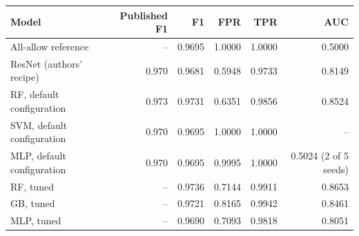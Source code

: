 \begin{tabular}{lrrrrr}
\toprule
Model & Published F1 & F1 & FPR & TPR & AUC \\
\midrule
All-allow reference & -- & 0.9695 & 1.0000 & 1.0000 & 0.5000 \\
\midrule
ResNet (authors' recipe) & 0.970 & 0.9681 & 0.5948 & 0.9733 & 0.8149 \\
RF, default configuration & 0.973 & 0.9731 & 0.6351 & 0.9856 & 0.8524 \\
SVM, default configuration & 0.970 & 0.9695 & 1.0000 & 1.0000 & -- \\
MLP, default configuration & 0.970 & 0.9695 & 0.9995 & 1.0000 & 0.5024 (2 of 5 seeds) \\
RF, tuned & -- & 0.9736 & 0.7144 & 0.9911 & 0.8653 \\
GB, tuned & -- & 0.9721 & 0.8165 & 0.9942 & 0.8461 \\
MLP, tuned & -- & 0.9690 & 0.7093 & 0.9818 & 0.8051 \\
\bottomrule
\end{tabular}
